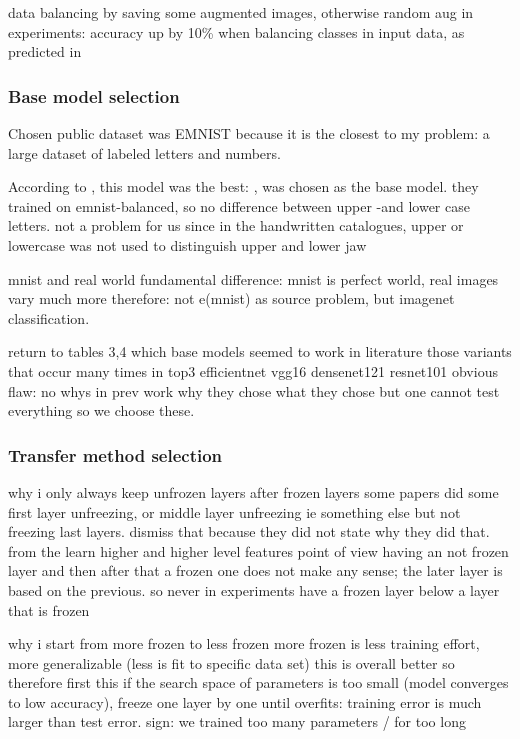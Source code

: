 \documentclass{article}
\begin{document}
data balancing by saving some augmented images, otherwise random aug
in experiments: accuracy up by 10\% when balancing classes in input data, 
as predicted in \cite{heLearningImbalancedData2009}

\subsubsection{Base model selection}

Chosen public dataset was EMNIST \cite{emnist} because it is the closest to my problem: a large dataset of labeled letters and numbers.

According to \cite{emnistclassifiersurvey}, this model was the best: \cite{jamilemnist}, was chosen as the base model.
they trained on emnist-balanced, so no difference between upper -and lower case letters. not a problem for us since 
in the handwritten catalogues, upper or lowercase was not used to distinguish upper and lower jaw

mnist and real world fundamental difference: mnist is perfect world, real images vary much more \cite{alexnet}
therefore: not e(mnist) as source problem, but imagenet classification.

return to tables 3,4 which base models seemed to work in literature
those variants that occur many times in top3
efficientnet
vgg16
densenet121
resnet101
obvious flaw: no whys in prev work why they chose what they chose but 
one cannot test everything so we choose these.

\subsubsection{Transfer method selection}

why i only always keep unfrozen layers after frozen layers
some papers did some first layer unfreezing, or middle layer unfreezing ie something else 
but not freezing last layers. dismiss that because 
they did not state why they did that. from the learn higher and higher level features point of view 
having an not frozen layer and then after that a frozen one does not make any sense; the later 
layer is based on the previous. so never in experiments have a frozen layer below a layer that is frozen

why i start from more frozen to less frozen
more frozen is less training effort, more generalizable (less is fit to specific data set)
this is overall better so therefore first this
if the search space of parameters is too small (model converges to low accuracy), freeze one layer by one 
until overfits: training error is much larger than test error. sign: we trained too many parameters / for too long
\end{document}
